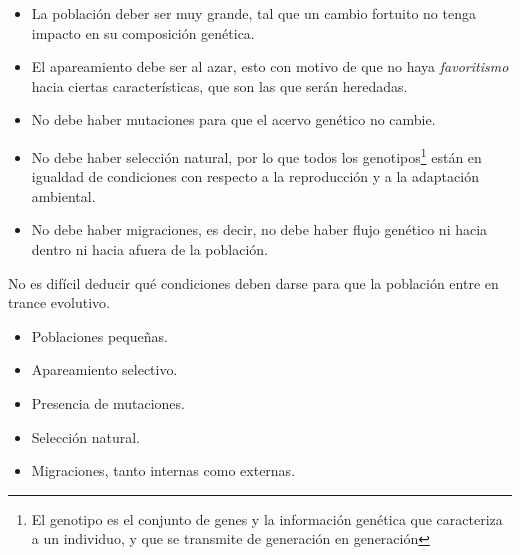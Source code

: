 \begin{itemize}
	\item

	      La población deber ser muy grande, tal que un cambio fortuito no tenga impacto en su composición genética.



	\item

	      El apareamiento debe ser al azar, esto con motivo de que no haya \textit{favoritismo} hacia ciertas características, que son las que serán heredadas.



	\item

	      No debe haber mutaciones para que el acervo genético no cambie.



	\item

	      No debe haber selección natural, por lo que todos los genotipos\footnote{El genotipo es el conjunto de genes y la información genética que caracteriza a un individuo, y que se transmite de generación en generación} están en igualdad de condiciones con respecto a la reproducción y a la adaptación ambiental.



	\item

	      No debe haber migraciones, es decir, no debe haber flujo genético ni hacia dentro ni hacia afuera de la población.
\end{itemize}

No es difícil deducir qué condiciones deben darse para que la población entre en trance evolutivo.

\begin{itemize}
	\item

	      Poblaciones pequeñas.



	\item

	      Apareamiento selectivo.



	\item

	      Presencia de mutaciones.



	\item

	      Selección natural.



	\item

	      Migraciones, tanto internas como externas.


\end{itemize}

